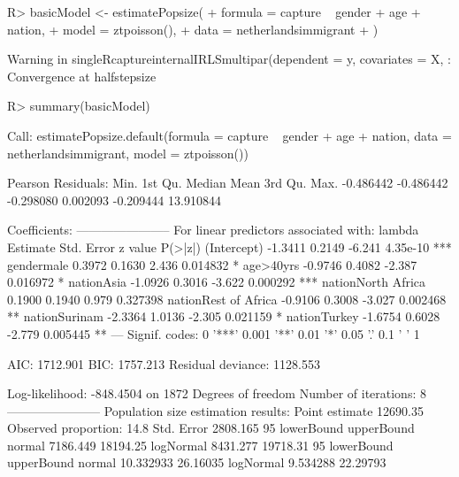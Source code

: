 \documentclass[
]{jss}
\newcommand{\1}{\mathcal{I}} \newcommand{\bZero}{\boldsymbol{0}}
\begin{document}
\begin{CodeChunk}
\begin{CodeInput}
R> basicModel <- estimatePopsize(
+   formula = capture ~ gender + age + nation,
+   model   = ztpoisson(),
+   data    = netherlandsimmigrant
+ )
\end{CodeInput}
\begin{CodeOutput}
Warning in singleRcaptureinternalIRLSmultipar(dependent = y, covariates = X, :
Convergence at halfstepsize
\end{CodeOutput}
\begin{CodeInput}
R> summary(basicModel)
\end{CodeInput}
\begin{CodeOutput}

Call:
estimatePopsize.default(formula = capture ~ gender + age + nation, 
    data = netherlandsimmigrant, model = ztpoisson())

Pearson Residuals:
     Min.   1st Qu.    Median      Mean   3rd Qu.      Max. 
-0.486442 -0.486442 -0.298080  0.002093 -0.209444 13.910844 

Coefficients:
-----------------------
For linear predictors associated with: lambda 
                     Estimate Std. Error z value  P(>|z|)    
(Intercept)           -1.3411     0.2149  -6.241 4.35e-10 ***
gendermale             0.3972     0.1630   2.436 0.014832 *  
age>40yrs             -0.9746     0.4082  -2.387 0.016972 *  
nationAsia            -1.0926     0.3016  -3.622 0.000292 ***
nationNorth Africa     0.1900     0.1940   0.979 0.327398    
nationRest of Africa  -0.9106     0.3008  -3.027 0.002468 ** 
nationSurinam         -2.3364     1.0136  -2.305 0.021159 *  
nationTurkey          -1.6754     0.6028  -2.779 0.005445 ** 
---
Signif. codes:  0 '***' 0.001 '**' 0.01 '*' 0.05 '.' 0.1 ' ' 1

AIC: 1712.901
BIC: 1757.213
Residual deviance: 1128.553

Log-likelihood: -848.4504 on 1872 Degrees of freedom 
Number of iterations: 8
-----------------------
Population size estimation results: 
Point estimate 12690.35
Observed proportion: 14.8%
Std. Error 2808.165
95%
          lowerBound upperBound
normal      7186.449   18194.25
logNormal   8431.277   19718.31
95%
          lowerBound upperBound
normal     10.332933   26.16035
logNormal   9.534288   22.29793
\end{CodeOutput}
\end{CodeChunk}
\end{document}
